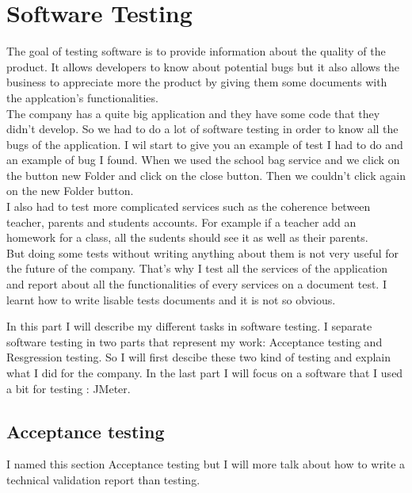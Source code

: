 
\section{Software Testing}

	The goal of testing software is to provide information about the quality of the product. 
	It allows developers to know about potential bugs but it also allows the business to appreciate more the product by giving them some 
documents with the applcation's functionalities. \\  

The company has a quite big application and they have some code that they didn't develop. So we had to do a lot of software testing in order to know all
the bugs of the application. 
I wil start to give you an example of test I had to do and an example of bug I found. 
When we used the school bag service and we click on the button new Folder and click on the close button. Then we couldn't
click again on the new Folder button. \\
I also had to test more complicated services such as the coherence between 
teacher, parents and students accounts. For example if a teacher add
an homework for a class, all the sudents should see it as well as their parents. \\

But doing some tests without writing anything about them is not very useful for the future of the company. That's why I test all the services of the application and report about all the functionalities of every services on a 
document test. I learnt how to write lisable tests documents and it is not so obvious.  

	 In this part I will describe my different tasks in software testing. 
	 I separate software testing in two parts that represent my work: Acceptance testing and Resgression testing. So I will first descibe these two kind of testing and explain what I did for the company. 
	 In the last part I will focus on a software that I used a bit for testing : JMeter.  \\

\newpage
\subsection{Acceptance testing}
I named this section Acceptance testing but I will more talk about how to 
write a technical validation report than testing. 

